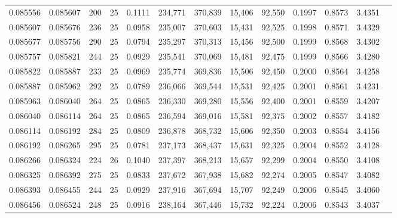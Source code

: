 \begin{tabular}{rrrrrrrrrrrrr}
0.085556 & 0.085607 &   200 &  25 &                                     0.1111 & 234,771 & 370,839 &  15,406 &  92,550 & 0.1997 & 0.8573 & 3.4351 \\
0.085607 & 0.085676 &   236 &  25 &                                     0.0958 & 235,007 & 370,603 &  15,431 &  92,525 & 0.1998 & 0.8571 & 3.4329 \\
0.085677 & 0.085756 &   290 &  25 &                                     0.0794 & 235,297 & 370,313 &  15,456 &  92,500 & 0.1999 & 0.8568 & 3.4302 \\
0.085757 & 0.085821 &   244 &  25 &                                     0.0929 & 235,541 & 370,069 &  15,481 &  92,475 & 0.1999 & 0.8566 & 3.4280 \\
0.085822 & 0.085887 &   233 &  25 &                                     0.0969 & 235,774 & 369,836 &  15,506 &  92,450 & 0.2000 & 0.8564 & 3.4258 \\
0.085887 & 0.085962 &   292 &  25 &                                     0.0789 & 236,066 & 369,544 &  15,531 &  92,425 & 0.2001 & 0.8561 & 3.4231 \\
0.085963 & 0.086040 &   264 &  25 &                                     0.0865 & 236,330 & 369,280 &  15,556 &  92,400 & 0.2001 & 0.8559 & 3.4207 \\
0.086040 & 0.086114 &   264 &  25 &                                     0.0865 & 236,594 & 369,016 &  15,581 &  92,375 & 0.2002 & 0.8557 & 3.4182 \\
0.086114 & 0.086192 &   284 &  25 &                                     0.0809 & 236,878 & 368,732 &  15,606 &  92,350 & 0.2003 & 0.8554 & 3.4156 \\
0.086192 & 0.086265 &   295 &  25 &                                     0.0781 & 237,173 & 368,437 &  15,631 &  92,325 & 0.2004 & 0.8552 & 3.4128 \\
0.086266 & 0.086324 &   224 &  26 &                                     0.1040 & 237,397 & 368,213 &  15,657 &  92,299 & 0.2004 & 0.8550 & 3.4108 \\
0.086325 & 0.086392 &   275 &  25 &                                     0.0833 & 237,672 & 367,938 &  15,682 &  92,274 & 0.2005 & 0.8547 & 3.4082 \\
0.086393 & 0.086455 &   244 &  25 &                                     0.0929 & 237,916 & 367,694 &  15,707 &  92,249 & 0.2006 & 0.8545 & 3.4060 \\
0.086456 & 0.086524 &   248 &  25 &                                     0.0916 & 238,164 & 367,446 &  15,732 &  92,224 & 0.2006 & 0.8543 & 3.4037 \\

\end{tabular}
